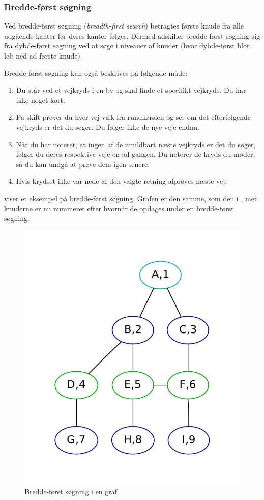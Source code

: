 \documentclass[10pt,a4paper,danish]{article}
\begin{document}
\subsubsection{Bredde-først søgning}
Ved bredde-først søgning (\textit{breadth-first search}) betragtes
første knude fra alle udgående kanter før deres kanter følges. Dermed
adskiller bredde-først søgning sig fra dybde-først søgning ved at søge
i niveauer af knuder (hvor dybde-først blot løb ned ad første knude).

Bredde-først søgning kan også beskrives på følgende måde:
\begin{enumerate}
\item Du står ved et vejkryds i en by og skal finde et specifikt
  vejkryds. Du har ikke noget kort.
\item På skift prøver du hver vej væk fra rundkørslen og ser om det
  efterfølgende vejkryds er det du søger. Du følger ikke de nye veje
  endnu.
\item Når du har noteret, at ingen af de umildbart næste vejkryds er
  det du søger, følger du deres respektive veje en ad gangen. Du
  noterer de kryds du møder, så du kan undgå at prøve dem igen senere.
\item Hvis krydset ikke var nede af den valgte retning afprøves næste vej.
\end{enumerate}

 viser et eksempel på bredde-først
søgning. Grafen er den samme, som den i , men
knuderne er nu nummeret efter hvornår de opdages under en bredde-først
søgning.

\begin{figure}[h]\centering
\includegraphics[width=.6\textwidth]{graphs/breadth-first.pdf}
\caption{Bredde-først søgning i en graf}
\label{fig:breadth-first}
\end{figure}
\end{document}
